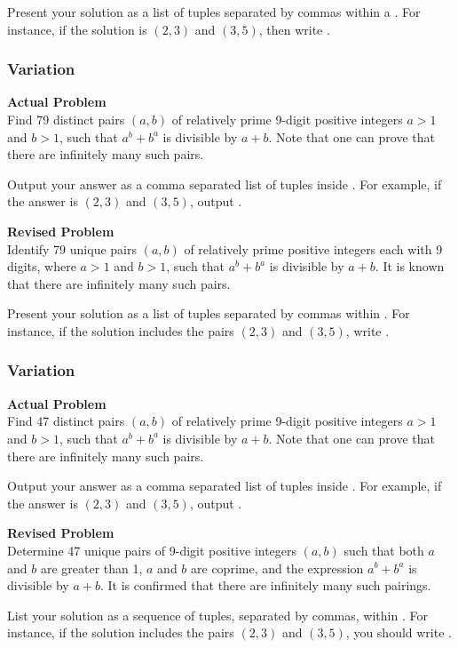 Present your solution as a list of tuples separated by commas within a . For instance, if the solution is \((2,3)\) and \((3,5)\), then write .

\subsubsection{Variation}
\textbf{Actual Problem}\\
Find 79 distinct pairs $(a,b)$ of relatively prime 9-digit positive integers $a>1$ and $b>1$, such that $a^b+b^a$ is divisible by $a+b$. Note that one can prove that there are infinitely many such pairs.

Output your answer as a comma separated list of tuples inside . For example, if the answer is $(2,3)$ and $(3,5)$, output .

\textbf{Revised Problem}\\
Identify 79 unique pairs \((a, b)\) of relatively prime positive integers each with 9 digits, where \(a > 1\) and \(b > 1\), such that \(a^b + b^a\) is divisible by \(a + b\). It is known that there are infinitely many such pairs.

Present your solution as a list of tuples separated by commas within . For instance, if the solution includes the pairs \((2,3)\) and \((3,5)\), write .

\subsubsection{Variation}
\textbf{Actual Problem}\\
Find 47 distinct pairs $(a,b)$ of relatively prime 9-digit positive integers $a>1$ and $b>1$, such that $a^b+b^a$ is divisible by $a+b$. Note that one can prove that there are infinitely many such pairs.

Output your answer as a comma separated list of tuples inside . For example, if the answer is $(2,3)$ and $(3,5)$, output .

\textbf{Revised Problem}\\
Determine 47 unique pairs of 9-digit positive integers \((a, b)\) such that both \(a\) and \(b\) are greater than 1, \(a\) and \(b\) are coprime, and the expression \(a^b + b^a\) is divisible by \(a + b\). It is confirmed that there are infinitely many such pairings.

List your solution as a sequence of tuples, separated by commas, within . For instance, if the solution includes the pairs \((2,3)\) and \((3,5)\), you should write .


